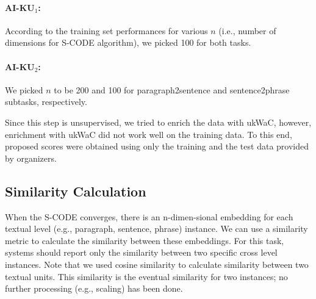\documentclass[11pt]{article}
\begin{document}
\paragraph{AI-KU$_1$:} According to the training set performances for various $n$ (i.e., number of dimensions for S-CODE algorithm), we picked 100 for both tasks.



\begin{table}[hl]
\begin{center}
\end{center}
\caption{\label{table:results-p2s-train} Paragraph-2-Sentence subtask scores for the training data. Subscripts in AI-KU systems specify the run number.}
\end{table}



\paragraph{AI-KU$_2$:} We picked $n$ to be 200 and 100 for paragraph2sentence and sentence2phrase subtasks, respectively.


Since this step is unsupervised, we tried to enrich the data with ukWaC, however, enrichment with ukWaC did not work well on the training data. To this end, proposed scores were obtained using only the training and the test data provided by organizers.


\subsection{Similarity Calculation}

When the S-CODE converges, there is an n-dimen-sional embedding for each textual level (e.g., paragraph, sentence, phrase) instance. We can use a similarity metric to calculate 
the similarity between these embeddings. For this task, systems should report only the similarity between two specific cross level instances. Note that we used cosine similarity to calculate similarity between two textual units. This similarity is the eventual similarity for two instances; no further processing (e.g., scaling) has been done.
\end{document}
